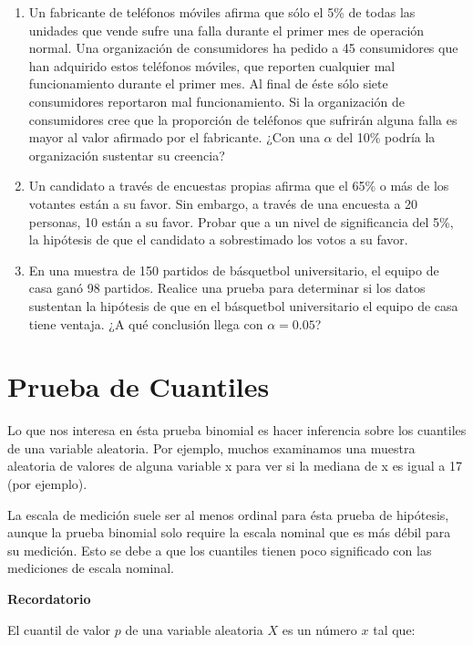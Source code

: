 \documentclass[
  a4paper,
  oneside,
  openany]{book}
\begin{document}
\begin{enumerate}
\def\labelenumi{\arabic{enumi}.}
\item
  Un fabricante de teléfonos móviles afirma que sólo el 5\% de todas las unidades que vende sufre una falla durante el primer mes de operación normal. Una organización de consumidores ha pedido a 45 consumidores que han adquirido estos teléfonos móviles, que reporten cualquier mal funcionamiento durante el primer mes. Al final de éste sólo siete consumidores reportaron mal funcionamiento. Si la organización de consumidores cree que la proporción de teléfonos que sufrirán alguna falla es mayor al valor afirmado por el fabricante. ¿Con una \(\alpha\) del 10\% podría la organización sustentar su creencia?
\item
  Un candidato a través de encuestas propias afirma que el 65\% o más de los votantes están a su favor. Sin embargo, a través de una encuesta a 20 personas, 10 están a su favor. Probar que a un nivel de significancia del 5\%, la hipótesis de que el candidato a sobrestimado los votos a su favor.
\item
  En una muestra de 150 partidos de básquetbol universitario, el equipo de casa ganó 98 partidos. Realice una prueba para determinar si los datos sustentan la hipótesis de que en el básquetbol universitario el equipo de casa tiene ventaja. ¿A qué conclusión llega con \(\alpha= 0.05\)?
\end{enumerate}

\hypertarget{prueba-de-cuantiles}{%
\chapter{Prueba de Cuantiles}\label{prueba-de-cuantiles}}

Lo que nos interesa en ésta prueba binomial es hacer inferencia sobre los cuantiles de una variable aleatoria. Por ejemplo, muchos examinamos una muestra aleatoria de valores de alguna variable x para ver si la mediana de x es igual a 17 (por ejemplo).

La escala de medición suele ser al menos ordinal para ésta prueba de hipótesis, aunque la prueba binomial solo require la escala nominal que es más débil para su medición. Esto se debe a que los cuantiles tienen poco significado con las mediciones de escala nominal.

\textbf{Recordatorio}

El cuantil de valor \(p\) de una variable aleatoria \(X\)
es un número \(x\) tal que:
\end{document}
